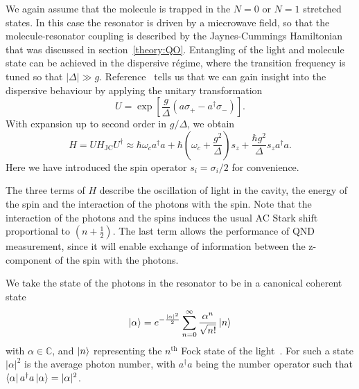 We again assume that the molecule is trapped in the $N=0$ or $N=1$ stretched
states. In this case the resonator is driven by a miecrowave field, so that the
molecule-resonator coupling is described by the Jaynes-Cummings
Hamiltonian that was discussed in section~\ref{theory:QO}.
%
Entangling of the light and molecule state can be achieved in the dispersive
r\'egime, where the transition frequency is tuned so that $|\Delta|\gg g$.
Reference~\cite{PhysRevA.69.062320} tells us that we can gain insight into the
dispersive behaviour by applying the unitary transformation
%
\begin{equation}
  U = \exp \left[\frac{g}{\Delta}(a\sigma_+ - a^\dagger\sigma_-)\right].
  \label{mws:eqn:Utransform}
\end{equation}
%
With expansion up to second order in $g/\Delta$, we obtain
%
\begin{equation} H= UH_\text{JC}U^\dagger \approx \hbar \omega_c
  a^\dagger a + \hbar\left(\omega_c +
  \frac{g^2}{\Delta}\right)s_z + \frac{\hbar
  g^2}{\Delta}s_z a^\dagger a.
  \label{mws:eqn:UHU}
\end{equation}
%
Here we have introduced the spin operator $s_i = \sigma_i/2$ for convenience.

The three terms of $H$ describe the oscillation of light in the cavity, the
energy of the spin and the interaction of the photons with the spin. Note that
the interaction of the photons and the spins induces the usual AC Stark shift
proportional to $(n+\frac{1}{2})$. The last term allows the performance of QND
measurement, since it will enable exchange of information between the
z-component of the spin with the photons.

We take the state of the photons in the resonator to be in a canonical coherent
state~\cite{Gazeau2009}
%
\begin{equation}
  \ket{\alpha} = e^{-\frac{|\alpha|^2}{2}}\sum_{n=0}^\infty \frac{\alpha^n}{\sqrt{n!}} \ket{n}
\end{equation}
%
with $\alpha\in\mathbb{C}$, and $\ket{n}$ representing the $n^\text{th}$
Fock state of the light~\cite{agarwal2012}. For such a state $|\alpha|^2$ is
the average photon number, with $a^\dagger a$ being the number operator such
that $\bra{\alpha}a^\dagger a \ket{\alpha} = |\alpha|^2$.

